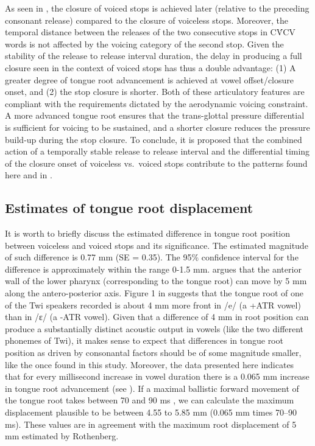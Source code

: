 \documentclass[12pt,]{article}
\begin{document}
As seen in \citet{coretta2018j}, the closure of voiced stops is achieved
later (relative to the preceding consonant release) compared to the
closure of voiceless stops. Moreover, the temporal distance between the
releases of the two consecutive stops in CV́CV words is not affected by
the voicing category of the second stop. Given the stability of the
release to release interval duration, the delay in producing a full
closure seen in the context of voiced stops has thus a double advantage:
(1) A greater degree of tongue root advancement is achieved at vowel
offset/closure onset, and (2) the stop closure is shorter. Both of these
articulatory features are compliant with the requirements dictated by
the aerodynamic voicing constraint. A more advanced tongue root ensures
that the trans-glottal pressure differential is sufficient for voicing
to be sustained, and a shorter closure reduces the pressure build-up
during the stop closure. To conclude, it is proposed that the combined
action of a temporally stable release to release interval and the
differential timing of the closure onset of voiceless vs.~voiced stops
contribute to the patterns found here and in \citet{coretta2018j}.

\hypertarget{estimates-of-tongue-root-displacement}{%
\subsection{Estimates of tongue root
displacement}\label{estimates-of-tongue-root-displacement}}

It is worth to briefly discuss the estimated difference in tongue root
position between voiceless and voiced stops and its significance. The
estimated magnitude of such difference is 0.77 mm (SE = 0.35). The 95\%
confidence interval for the difference is approximately within the range
0-1.5 mm. \citet{rothenberg1967} argues that the anterior wall of the
lower pharynx (corresponding to the tongue root) can move by 5 mm along
the antero-posterior axis. Figure 1 in \citet{kirkham2017} suggests that
the tongue root of one of the Twi speakers recorded is about 4 mm more
front in /e/ (a +ATR vowel) than in /ɛ/ (a -ATR vowel). Given that a
difference of 4 mm in root position can produce a substantially distinct
acoustic output in vowels (like the two different phonemes of Twi), it
makes sense to expect that differences in tongue root position as driven
by consonantal factors should be of some magnitude smaller, like the
once found in this study. Moreover, the data presented here indicates
that for every millisecond increase in vowel duration there is a 0.065
mm increase in tongue root advancement (see ). If a
maximal ballistic forward movement of the tongue root takes between 70
and 90 ms \citep{rothenberg1967}, we can calculate the maximum
displacement plausible to be between 4.55 to 5.85 mm (0.065 mm times
70--90 ms). These values are in agreement with the maximum root
displacement of 5 mm estimated by Rothenberg.
\end{document}
